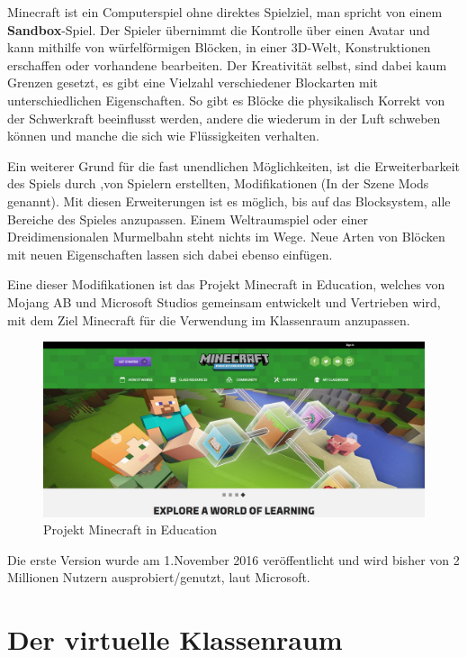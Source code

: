 Minecraft ist ein Computerspiel ohne direktes Spielziel, man spricht von einem \textbf{Sandbox}-Spiel.
Der Spieler übernimmt die Kontrolle über einen Avatar und kann mithilfe von würfelförmigen Blöcken,
in einer 3D-Welt, Konstruktionen erschaffen oder vorhandene bearbeiten. Der Kreativität selbst,
sind dabei kaum Grenzen gesetzt, es gibt eine Vielzahl verschiedener Blockarten mit unterschiedlichen
Eigenschaften. So gibt es Blöcke die physikalisch Korrekt von der Schwerkraft beeinflusst werden,
andere die wiederum in der Luft schweben können und manche die sich wie Flüssigkeiten verhalten.
\cite{WikiMinecraft}

Ein weiterer Grund für die fast unendlichen Möglichkeiten, ist die Erweiterbarkeit des Spiels durch
,von Spielern erstellten, Modifikationen (In der Szene Mods genannt). Mit diesen Erweiterungen ist es
möglich, bis auf das Blocksystem, alle Bereiche des Spieles anzupassen. Einem Weltraumspiel oder einer
Dreidimensionalen Murmelbahn steht nichts im Wege. Neue Arten von Blöcken mit neuen Eigenschaften lassen
sich dabei ebenso einfügen. 

Eine dieser Modifikationen ist das Projekt Minecraft in Education, welches
von Mojang AB und Microsoft Studios gemeinsam entwickelt und Vertrieben wird, mit dem Ziel Minecraft für die Verwendung im Klassenraum anzupassen. \cite{GamepediaMinecraft}

\begin{figure}[ht]
	\centering
	\includegraphics[width=\textwidth,height=\textheight,keepaspectratio]{images/Minecraft.png}
	\caption{Projekt Minecraft in Education \cite{HomepageMinecraftEducation}}
	\label{projectMinecraft}
\end{figure}

Die erste Version wurde am 1.November 2016 veröffentlicht und wird bisher von 2 Millionen Nutzern ausprobiert/genutzt, laut Microsoft.

\section{Der virtuelle Klassenraum}

